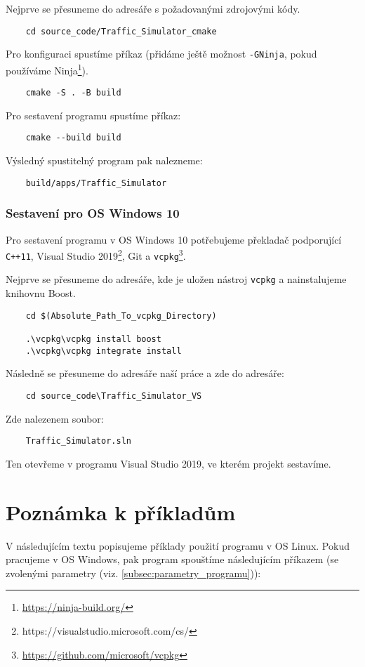 Nejprve se přesuneme do adresáře s požadovanými zdrojovými kódy.
\begin{verbatim}
    cd source_code/Traffic_Simulator_cmake
\end{verbatim}

Pro konfiguraci spustíme příkaz (přidáme ještě možnost \texttt{-GNinja}, 
pokud používáme Ninja\footnote{\url{https://ninja-build.org/}}).
\begin{verbatim}
    cmake -S . -B build
\end{verbatim}

Pro sestavení programu spustíme příkaz:
\begin{verbatim}
    cmake --build build
\end{verbatim}

Výsledný spustitelný program pak nalezneme:
\begin{verbatim}
    build/apps/Traffic_Simulator
\end{verbatim}

\subsubsection{Sestavení pro OS Windows 10}
Pro sestavení programu v OS Windows 10 potřebujeme překladač podporující 
\texttt{C++11}, Visual Studio 2019\footnote{https://visualstudio.microsoft.com/cs/},
Git a \texttt{vcpkg}\footnote{\url{https://github.com/microsoft/vcpkg}}.

Nejprve se přesuneme do adresáře, kde je uložen nástroj \texttt{vcpkg} a 
nainstalujeme knihovnu Boost.
\begin{verbatim}
    cd $(Absolute_Path_To_vcpkg_Directory)

    .\vcpkg\vcpkg install boost
    .\vcpkg\vcpkg integrate install
\end{verbatim}

Následně se přesuneme do adresáře naší práce a zde do adresáře:

\begin{verbatim}
    cd source_code\Traffic_Simulator_VS
\end{verbatim}
 
Zde nalezenem soubor:
\begin{verbatim}
    Traffic_Simulator.sln
\end{verbatim}

Ten otevřeme v programu Visual Studio 2019, ve kterém projekt sestavíme.

\section{Poznámka k příkladům}
V následujícím textu popisujeme příklady použití programu v OS Linux.
Pokud pracujeme v OS Windows, pak program spouštíme následujícím příkazem
(se zvolenými parametry (viz. \cref{subsec:parametry_programu})):


